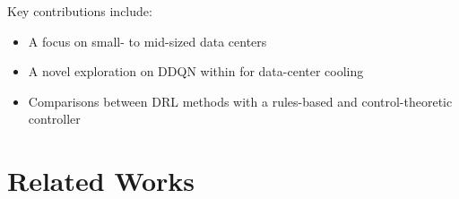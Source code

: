 \documentclass[12pt]{article}
\begin{document}
Key contributions include: 
\begin{itemize}
    \item A focus on small- to mid-sized data centers
    \item A novel exploration on DDQN within for data-center cooling
    \item Comparisons between DRL methods with a rules-based and control-theoretic controller
\end{itemize}



\section{Related Works}

\end{document}
